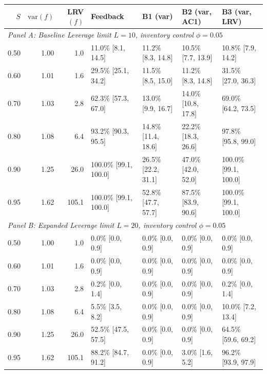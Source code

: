 \begin{tabular}{rrrllll}\toprule
$S$ & $\mathrm{var}(f)$ & LRV$(f)$ & Feedback & B1 (var) & B2 (var, AC1) & B3 (var, LRV)\\\midrule
\multicolumn{7}{l}{\textit{Panel A: Baseline Leverage limit $L=10$, inventory control $\phi=0.05$}}\\
0.50 & 1.00 & 1.0 & 11.0\% [8.1, 14.5] & 11.2\% [8.3, 14.8] & 10.5\% [7.7, 13.9] & 10.8\% [7.9, 14.2]\\
0.60 & 1.01 & 1.6 & 29.5\% [25.1, 34.2] & 11.5\% [8.5, 15.0] & 11.2\% [8.3, 14.8] & 31.5\% [27.0, 36.3]\\
0.70 & 1.03 & 2.8 & 62.3\% [57.3, 67.0] & 13.0\% [9.9, 16.7] & 14.0\% [10.8, 17.8] & 69.0\% [64.2, 73.5]\\
0.80 & 1.08 & 6.4 & 93.2\% [90.3, 95.5] & 14.8\% [11.4, 18.6] & 22.2\% [18.3, 26.6] & 97.8\% [95.8, 99.0]\\
0.90 & 1.25 & 26.0 & 100.0\% [99.1, 100.0] & 26.5\% [22.2, 31.1] & 47.0\% [42.0, 52.0] & 100.0\% [99.1, 100.0]\\
0.95 & 1.62 & 105.1 & 100.0\% [99.1, 100.0] & 52.8\% [47.7, 57.7] & 87.5\% [83.9, 90.6] & 100.0\% [99.1, 100.0]\\
\midrule
\multicolumn{7}{l}{\textit{Panel B: Expanded Leverage limit $L=20$, inventory control $\phi=0.05$}}\\
0.50 & 1.00 & 1.0 & 0.0\% [0.0, 0.9] & 0.0\% [0.0, 0.9] & 0.0\% [0.0, 0.9] & 0.0\% [0.0, 0.9]\\
0.60 & 1.01 & 1.6 & 0.0\% [0.0, 0.9] & 0.0\% [0.0, 0.9] & 0.0\% [0.0, 0.9] & 0.0\% [0.0, 0.9]\\
0.70 & 1.03 & 2.8 & 0.2\% [0.0, 1.4] & 0.0\% [0.0, 0.9] & 0.0\% [0.0, 0.9] & 0.2\% [0.0, 1.4]\\
0.80 & 1.08 & 6.4 & 5.5\% [3.5, 8.2] & 0.0\% [0.0, 0.9] & 0.0\% [0.0, 0.9] & 10.0\% [7.2, 13.4]\\
0.90 & 1.25 & 26.0 & 52.5\% [47.5, 57.5] & 0.0\% [0.0, 0.9] & 0.0\% [0.0, 0.9] & 64.5\% [59.6, 69.2]\\
0.95 & 1.62 & 105.1 & 88.2\% [84.7, 91.2] & 0.0\% [0.0, 0.9] & 3.0\% [1.6, 5.2] & 96.2\% [93.9, 97.9]\\
\bottomrule\end{tabular}

